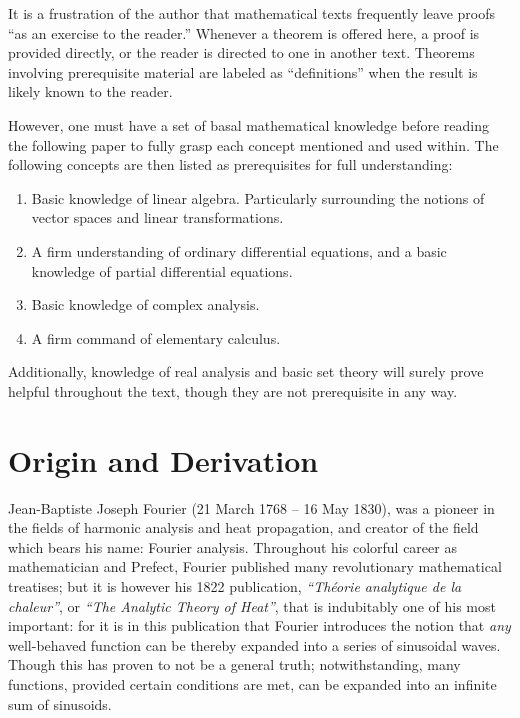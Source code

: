 \documentclass[12pt,a4paper]{report}
\theoremstyle{thms}
\theoremstyle{defns}
\begin{document}
It is a frustration of the author that mathematical texts frequently leave proofs ``as an exercise to the reader.'' Whenever a theorem is offered here, a proof is provided directly, or the reader is directed to one in another text. Theorems involving prerequisite material are labeled as ``definitions'' when the result is likely known to the reader.

However, one must have a set of basal mathematical knowledge before reading the following paper to fully grasp each concept mentioned and used within. The following concepts are then listed as prerequisites for full understanding:

\begin{enumerate}
    \item Basic knowledge of linear algebra. Particularly surrounding the notions of vector spaces and linear transformations.
    \item A firm understanding of ordinary differential equations, and a basic knowledge of partial differential equations.
    \item Basic knowledge of complex analysis.
    \item A firm command of elementary calculus.
\end{enumerate}

Additionally, knowledge of real analysis and basic set theory will surely prove helpful throughout the text, though they are not prerequisite in any way.

\chapter{Origin and Derivation}
\label{ch:origin}

Jean-Baptiste Joseph Fourier (21 March 1768 – 16 May 1830), was a pioneer in the fields of harmonic analysis and heat propagation, and creator of the field which bears his name: Fourier analysis. Throughout his colorful career as mathematician and Prefect, Fourier published many revolutionary mathematical treatises; but it is however his 1822 publication, \textit{``Théorie analytique de la chaleur''}, or \textit{``The Analytic Theory of Heat''}, that is indubitably one of his most important: for it is in this publication that Fourier introduces the notion that \textit{any} well-behaved function can be thereby expanded into a series of sinusoidal waves. Though this has proven to not be a general truth; notwithstanding, many functions, provided certain conditions are met, can be expanded into an infinite sum of sinusoids.
\end{document}

